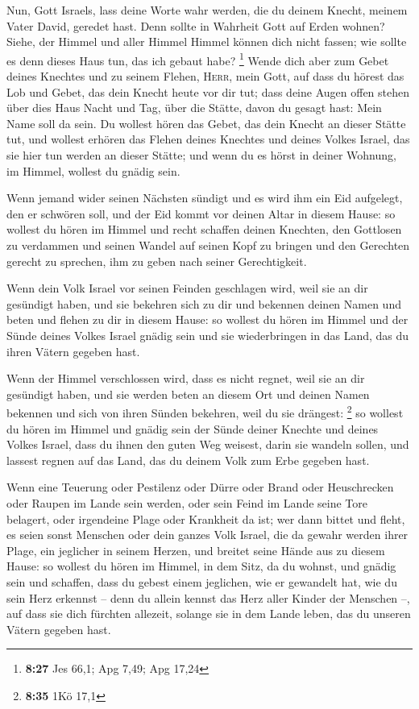  Nun, Gott Israels, lass deine Worte wahr werden, die du
deinem Knecht, meinem Vater David, geredet hast.  Denn
sollte in Wahrheit Gott auf Erden wohnen? Siehe, der Himmel und aller
Himmel Himmel können dich nicht fassen; wie sollte es denn dieses Haus
tun, das ich gebaut habe? \footnote{\textbf{8:27} Jes 66,1; Apg 7,49;
  Apg 17,24}  Wende dich aber zum Gebet deines Knechtes
und zu seinem Flehen, \textsc{Herr}, mein Gott, auf dass du hörest das
Lob und Gebet, das dein Knecht heute vor dir tut;  dass
deine Augen offen stehen über dies Haus Nacht und Tag, über die Stätte,
davon du gesagt hast: Mein Name soll da sein. Du wollest hören das
Gebet, das dein Knecht an dieser Stätte tut,  und wollest
erhören das Flehen deines Knechtes und deines Volkes Israel, das sie
hier tun werden an dieser Stätte; und wenn du es hörst in deiner
Wohnung, im Himmel, wollest du gnädig sein.

 Wenn jemand wider seinen Nächsten sündigt und es wird
ihm ein Eid aufgelegt, den er schwören soll, und der Eid kommt vor
deinen Altar in diesem Hause:  so wollest du hören im
Himmel und recht schaffen deinen Knechten, den Gottlosen zu verdammen
und seinen Wandel auf seinen Kopf zu bringen und den Gerechten gerecht
zu sprechen, ihm zu geben nach seiner Gerechtigkeit.

 Wenn dein Volk Israel vor seinen Feinden geschlagen
wird, weil sie an dir gesündigt haben, und sie bekehren sich zu dir und
bekennen deinen Namen und beten und flehen zu dir in diesem Hause:
 so wollest du hören im Himmel und der Sünde deines
Volkes Israel gnädig sein und sie wiederbringen in das Land, das du
ihren Vätern gegeben hast.

 Wenn der Himmel verschlossen wird, dass es nicht regnet,
weil sie an dir gesündigt haben, und sie werden beten an diesem Ort und
deinen Namen bekennen und sich von ihren Sünden bekehren, weil du sie
drängest: \footnote{\textbf{8:35} 1Kö 17,1}  so wollest
du hören im Himmel und gnädig sein der Sünde deiner Knechte und deines
Volkes Israel, dass du ihnen den guten Weg weisest, darin sie wandeln
sollen, und lassest regnen auf das Land, das du deinem Volk zum Erbe
gegeben hast.

 Wenn eine Teuerung oder Pestilenz oder Dürre oder Brand
oder Heuschrecken oder Raupen im Lande sein werden, oder sein Feind im
Lande seine Tore belagert, oder irgendeine Plage oder Krankheit da ist;
 wer dann bittet und fleht, es seien sonst Menschen oder
dein ganzes Volk Israel, die da gewahr werden ihrer Plage, ein jeglicher
in seinem Herzen, und breitet seine Hände aus zu diesem Hause:
 so wollest du hören im Himmel, in dem Sitz, da du
wohnst, und gnädig sein und schaffen, dass du gebest einem jeglichen,
wie er gewandelt hat, wie du sein Herz erkennst -- denn du allein kennst
das Herz aller Kinder der Menschen --,  auf dass sie dich
fürchten allezeit, solange sie in dem Lande leben, das du unseren Vätern
gegeben hast.

